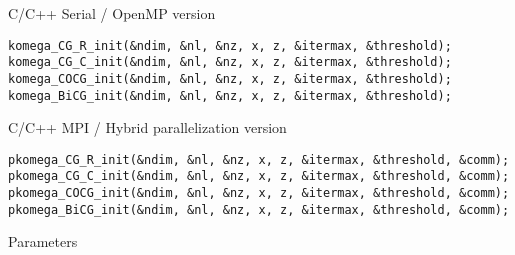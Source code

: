 \documentclass[12pt,titlepage]{article}
\begin{document}
\noindent C/C++ Serial / OpenMP version
\begin{verbatim}
komega_CG_R_init(&ndim, &nl, &nz, x, z, &itermax, &threshold);
komega_CG_C_init(&ndim, &nl, &nz, x, z, &itermax, &threshold);
komega_COCG_init(&ndim, &nl, &nz, x, z, &itermax, &threshold);
komega_BiCG_init(&ndim, &nl, &nz, x, z, &itermax, &threshold);
\end{verbatim}

\noindent C/C++ MPI / Hybrid parallelization version
\begin{verbatim}
pkomega_CG_R_init(&ndim, &nl, &nz, x, z, &itermax, &threshold, &comm);
pkomega_CG_C_init(&ndim, &nl, &nz, x, z, &itermax, &threshold, &comm);
pkomega_COCG_init(&ndim, &nl, &nz, x, z, &itermax, &threshold, &comm);
pkomega_BiCG_init(&ndim, &nl, &nz, x, z, &itermax, &threshold, &comm);
\end{verbatim}

\noindent Parameters
\end{document}
